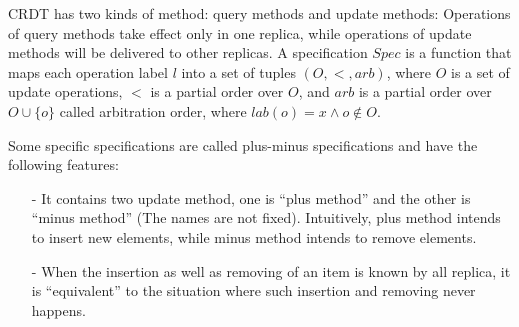 CRDT has two kinds of method: query methods and update methods: Operations of query methods take effect only in one replica, while operations of update methods will be delivered to other replicas. A specification $Spec$ is a function that maps each operation label $l$ into a set of tuples $(O,<,arb)$, where {\color {red}$O$ is a set of update operations}, $<$ is a partial order over $O$, {\color {red}and $arb$ is a partial order over $O \cup \{ o \}$ called arbitration order, where $lab(o)=x \wedge o \notin O$.}






Some specific specifications are called plus-minus specifications and have the following features:

\begin{itemize}
\setlength{\itemsep}{0.5pt}
\item[-] It contains two update method, one is ``plus method'' and the other is ``minus method'' (The names are not fixed). Intuitively, plus method intends to insert new elements, while minus method intends to remove elements.

\item[-] When the insertion as well as removing of an item is known by all replica, it is ``equivalent'' to the situation where such insertion and removing never happens.
\end{itemize}


